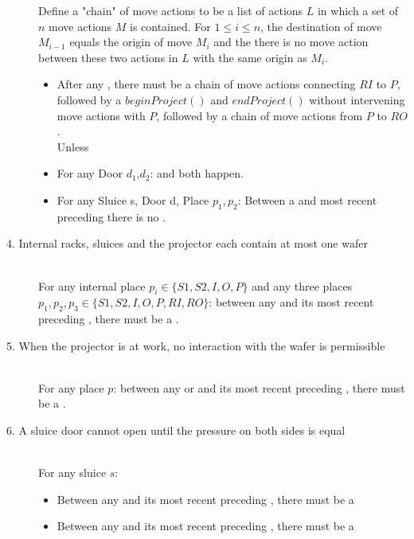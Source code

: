 \begin{description}
 \item[] \hfill 
 Define a "chain" of move actions to be a list of actions $L$  in which a set of $n$ move actions $M$ is contained. For $1 \leq i \leq n$, the destination of move $M_{i-1}$ equals the origin of move $M_{i}$ and the there is no move action between these two actions in $L$ with the same origin as $M_{i}$.
 \begin{itemize}
 \item After any , there must be a chain of move actions connecting $RI$ to $P$, followed by a $beginProject()$ and $endProject()$ without intervening move actions with $P$, followed by a chain of move actions from $P$ to $RO$.\\
 Unless\\
 \item For any Door $d_1$,$d_2$:  and  both happen.
 \item For any Sluice s, Door d, Place $p_1,p_2$: Between a  and most recent preceding  there is no . 
 \end{itemize}
 
 
\item[4. Internal racks, sluices and the projector each contain at most one wafer] \hfill \\
For any internal place $p_i \in \{S1, S2, I, O, P\}$ and any three places $p_1, p_2, p_3 \in \{S1, S2, I, O, P, RI, RO\}$: between any  and its most recent preceding , there must be a . 
 
\item[5. When the projector is at work, no interaction with the wafer is permissible] \hfill \\
For any place $p$: between any  or  and its most recent preceding , there must be a . 
 
 \item[6. A sluice door cannot open until the pressure on both sides is equal] \hfill \\
 For any sluice $s$:
 \begin{itemize}
  \item Between any  and its most recent preceding , there must be a 
  \item Between any  and its most recent preceding , there must be a 
 \end{itemize}


\end{description}
